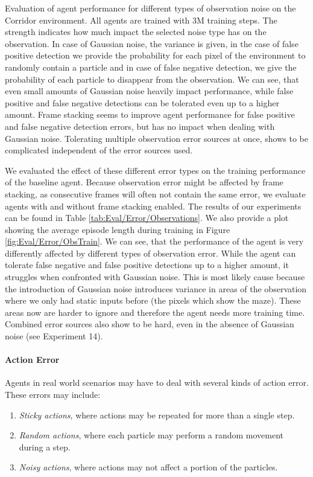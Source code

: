 \begin{table}[ht!]
    \caption[Evaluation of the Influence of Observation Error]{Evaluation of agent performance for different types of observation noise on the Corridor environment. All agents are trained with 3M training steps. The strength indicates how much impact the selected noise type has on the observation. In case of Gaussian noise, the variance is given, in the case of false positive detection we provide the probability for each pixel of the environment to randomly contain a particle and in case of false negative detection, we give the probability of each particle to disappear from the observation. We can see, that even small amounts of Gaussian noise heavily impact performance, while false positive and false negative detections can be tolerated even up to a higher amount. Frame stacking seems to improve agent performance for false positive and false negative detection errors, but has no impact when dealing with Gaussian noise. Tolerating multiple observation error sources at once, shows to be complicated independent of the error sources used.} \label{tab:Eval/Error/Observations}
\end{table}


We evaluated the effect of these different error types on the training performance of the baseline agent. Because observation error might be affected by frame stacking, as consecutive frames will often not contain the same error, we evaluate agents with and without frame stacking enabled. The results of our experiments can be found in Table \ref{tab:Eval/Error/Observations}. We also provide a plot showing the average episode length during training in Figure \ref{fig:Eval/Error/ObsTrain}. We can see, that the performance of the agent is very differently affected by different types of observation error. While the agent can tolerate false negative and false positive detections up to a higher amount, it struggles when confronted with Gaussian noise. This is most likely cause because the introduction of Gaussian noise introduces variance in areas of the observation where we only had static inputs before (the pixels which show the maze). These areas now are harder to ignore and therefore the agent needs more training time. Combined error sources also show to be hard, even in the absence of Gaussian noise (see Experiment 14). 

\paragraph{Action Error}
Agents in real world scenarios may have to deal with several kinds of action error. These errors may include:
\begin{enumerate}
    \item \textit{Sticky actions}, where actions may be repeated for more than a single step.
    \item \textit{Random actions}, where each particle may perform a random movement during a step.
    \item \textit{Noisy actions}, where actions may not affect a portion of the particles.
\end{enumerate}

